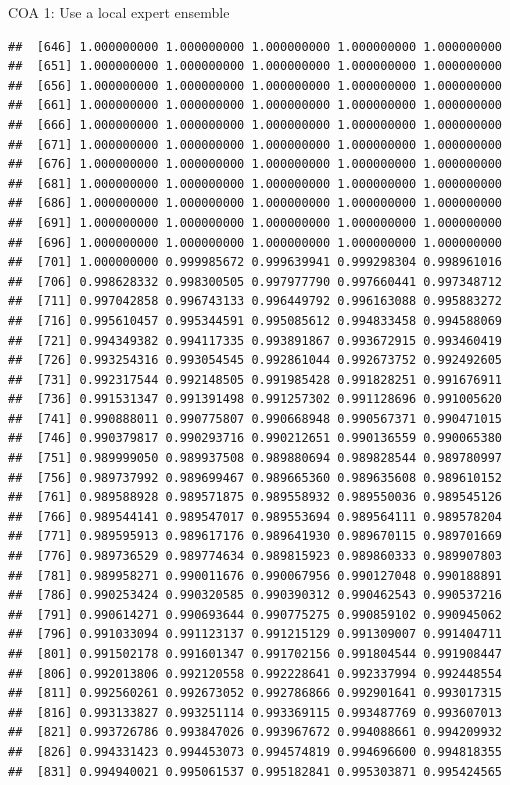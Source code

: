 \documentclass[ignorenonframetext,]{beamer}
\begin{document}
\begin{frame}[fragile]{COA 1: Use a local expert ensemble}
\begin{verbatim}
##  [646] 1.000000000 1.000000000 1.000000000 1.000000000 1.000000000
##  [651] 1.000000000 1.000000000 1.000000000 1.000000000 1.000000000
##  [656] 1.000000000 1.000000000 1.000000000 1.000000000 1.000000000
##  [661] 1.000000000 1.000000000 1.000000000 1.000000000 1.000000000
##  [666] 1.000000000 1.000000000 1.000000000 1.000000000 1.000000000
##  [671] 1.000000000 1.000000000 1.000000000 1.000000000 1.000000000
##  [676] 1.000000000 1.000000000 1.000000000 1.000000000 1.000000000
##  [681] 1.000000000 1.000000000 1.000000000 1.000000000 1.000000000
##  [686] 1.000000000 1.000000000 1.000000000 1.000000000 1.000000000
##  [691] 1.000000000 1.000000000 1.000000000 1.000000000 1.000000000
##  [696] 1.000000000 1.000000000 1.000000000 1.000000000 1.000000000
##  [701] 1.000000000 0.999985672 0.999639941 0.999298304 0.998961016
##  [706] 0.998628332 0.998300505 0.997977790 0.997660441 0.997348712
##  [711] 0.997042858 0.996743133 0.996449792 0.996163088 0.995883272
##  [716] 0.995610457 0.995344591 0.995085612 0.994833458 0.994588069
##  [721] 0.994349382 0.994117335 0.993891867 0.993672915 0.993460419
##  [726] 0.993254316 0.993054545 0.992861044 0.992673752 0.992492605
##  [731] 0.992317544 0.992148505 0.991985428 0.991828251 0.991676911
##  [736] 0.991531347 0.991391498 0.991257302 0.991128696 0.991005620
##  [741] 0.990888011 0.990775807 0.990668948 0.990567371 0.990471015
##  [746] 0.990379817 0.990293716 0.990212651 0.990136559 0.990065380
##  [751] 0.989999050 0.989937508 0.989880694 0.989828544 0.989780997
##  [756] 0.989737992 0.989699467 0.989665360 0.989635608 0.989610152
##  [761] 0.989588928 0.989571875 0.989558932 0.989550036 0.989545126
##  [766] 0.989544141 0.989547017 0.989553694 0.989564111 0.989578204
##  [771] 0.989595913 0.989617176 0.989641930 0.989670115 0.989701669
##  [776] 0.989736529 0.989774634 0.989815923 0.989860333 0.989907803
##  [781] 0.989958271 0.990011676 0.990067956 0.990127048 0.990188891
##  [786] 0.990253424 0.990320585 0.990390312 0.990462543 0.990537216
##  [791] 0.990614271 0.990693644 0.990775275 0.990859102 0.990945062
##  [796] 0.991033094 0.991123137 0.991215129 0.991309007 0.991404711
##  [801] 0.991502178 0.991601347 0.991702156 0.991804544 0.991908447
##  [806] 0.992013806 0.992120558 0.992228641 0.992337994 0.992448554
##  [811] 0.992560261 0.992673052 0.992786866 0.992901641 0.993017315
##  [816] 0.993133827 0.993251114 0.993369115 0.993487769 0.993607013
##  [821] 0.993726786 0.993847026 0.993967672 0.994088661 0.994209932
##  [826] 0.994331423 0.994453073 0.994574819 0.994696600 0.994818355
##  [831] 0.994940021 0.995061537 0.995182841 0.995303871 0.995424565

\end{verbatim}
\end{frame}
\end{document}
